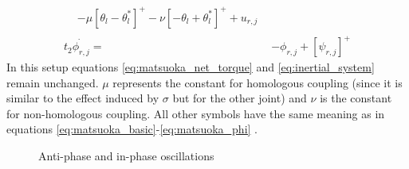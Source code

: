 \documentclass[12pt,twoside]{article}
\theoremstyle{plain}
\theoremstyle{definition}
\theoremstyle{remark}
\begin{document}
\begin{enumerate}
\begin{subequations}
\begin{align}
\begin{split}
& - \mu [\theta_l - \theta_l^*]^+ - \nu [-\theta_l + \theta_l^*]^+ + u_{r,j}
\end{split}
\\
%
\label{eq:matsuoka_coupled4}
t_2 \dot{\phi_{r,j}} ={}& -\phi_{r,j} + [\psi_{r,j}]^+
\end{align}
%
\end{subequations}
In this setup equations \ref{eq:matsuoka_net_torque} and  \ref{eq:inertial_system} remain unchanged. $\mu$ represents the constant for homologous coupling (since it is similar to the effect induced by $\sigma$ but for the other joint) and $\nu$ is the constant for non-homologous coupling. All other symbols have the same meaning as in equations  \ref{eq:matsuoka_basic}-\ref{eq:matsuoka_phi} \cite{Ronsse2009}.
\end{enumerate}
\begin{figure}[H]
\centering     %
{}
\caption{Anti-phase and in-phase oscillations}
\label{fig:in-anti-phase}
\end{figure}
\end{document}
